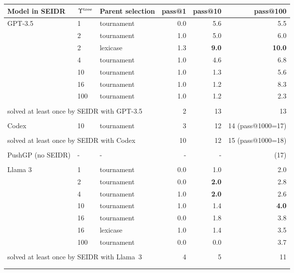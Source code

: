 \begin{tabular}{lllrrr}
\toprule
Model in SEIDR & $\Upsilon^\text{tree}$ & Parent selection &  pass@1 &  pass@10 &  pass@100 \\
\midrule
GPT-3.5 & 1   &         tournament &     0.0 &      5.6 &       5.5 \\
& 2   &         tournament &     1.0 &      5.0 &       6.0 \\
& 2   &           lexicase &     1.3 &     \textbf{ 9.0} &      \textbf{10.0} \\
& 4   &         tournament &     1.0 &      4.6 &       6.8 \\
& 10  &         tournament &     1.0 &      1.3 &       5.6 \\
& 16  &         tournament &     1.0 &      1.2 &       8.3 \\
& 100 &         tournament &     1.0 &      1.2 &       2.3 \\[1pt]
\cline{2-6}\\[-8pt]
\multicolumn{3}{l}{solved at least once by SEIDR with GPT-3.5}   & 2 &       13 &       13 \\[1pt]
% 
\cline{1-6}\\[-8pt]
Codex  & 10 & tournament &     3 &       12 &   14 (pass@1000=17)\\[1pt]
\cline{2-6}\\[-8pt]
\multicolumn{3}{l}{solved at least once by SEIDR with Codex}   & 10 &       12 &        15 (pass@1000=18) \\[1pt]
\cline{1-6}\\[-8pt]
PushGP (no SEIDR) & -   &    -            &       - &        - &      (17)\\[1pt]
\cline{1-6}\\[-8pt]
Llama 3 & 1   &         tournament &     0.0 &      1.0 &       2.0 \\
& 2   &         tournament &     0.0 &      \textbf{2.0} &       2.8 \\
& 4   &         tournament &     1.0 &     \textbf{ 2.0} &       2.6 \\
& 10  &         tournament &     1.0 &      1.4 &       \textbf{4.0} \\
& 16  &         tournament &     0.0 &      1.8 &       3.8 \\
& 16  &           lexicase &    1.0 &      1.4 &       3.5 \\
& 100 &         tournament &     0.0 &      0.0 &       3.7 \\[1pt]
\cline{2-6}\\[-8pt]
\multicolumn{3}{l}{solved at least once by SEIDR with Llama~3}  & 4 &        5 &       11  \\
    \bottomrule
\\ %
\\ %
\end{tabular}